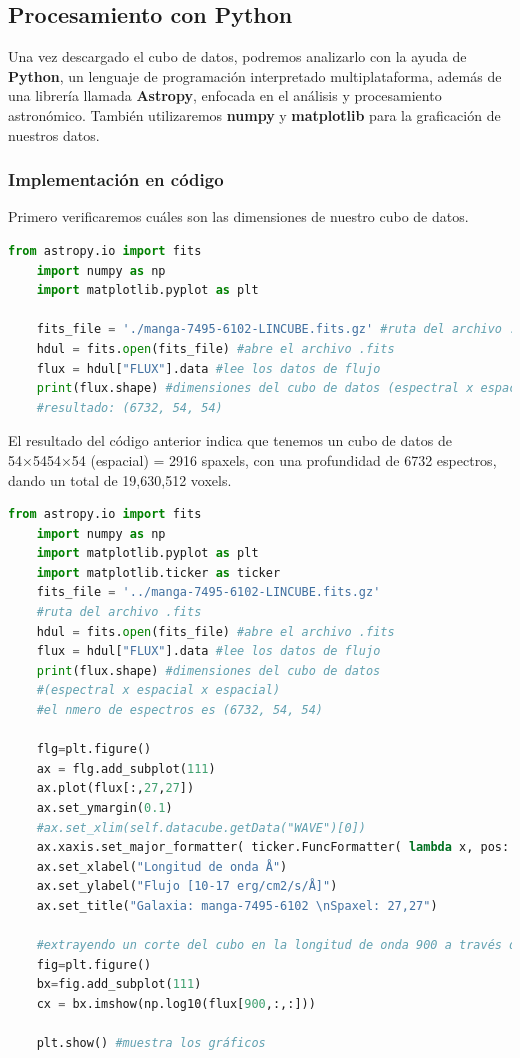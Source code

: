 \documentclass[9pt,twocolumn,a4paper]{opticajnl}
\begin{document}
\subsection*{Procesamiento con Python}

Una vez descargado el cubo de datos, podremos analizarlo con la ayuda de \textbf{Python}, un lenguaje de programación interpretado multiplataforma, además de una librería llamada \textbf{Astropy}, enfocada en el análisis y procesamiento astronómico. También utilizaremos \textbf{numpy} y \textbf{matplotlib} para la graficación de nuestros datos.

\subsubsection*{Implementación en código}

Primero verificaremos cuáles son las dimensiones de nuestro cubo de datos.

\begin{lstlisting}[language=Python]
    from astropy.io import fits
    import numpy as np
    import matplotlib.pyplot as plt
    
    fits_file = './manga-7495-6102-LINCUBE.fits.gz' #ruta del archivo .fits
    hdul = fits.open(fits_file) #abre el archivo .fits
    flux = hdul["FLUX"].data #lee los datos de flujo
    print(flux.shape) #dimensiones del cubo de datos (espectral x espacial x espacial)
    #resultado: (6732, 54, 54)
\end{lstlisting}

El resultado del código anterior indica que tenemos un cubo de datos de 54×5454×54 (espacial) = 2916 spaxels, con una profundidad de 6732 espectros, dando un total de 19,630,512 voxels.
\begin{lstlisting}[language=Python]
    from astropy.io import fits
    import numpy as np
    import matplotlib.pyplot as plt
    import matplotlib.ticker as ticker
    fits_file = '../manga-7495-6102-LINCUBE.fits.gz'
    #ruta del archivo .fits
    hdul = fits.open(fits_file) #abre el archivo .fits
    flux = hdul["FLUX"].data #lee los datos de flujo
    print(flux.shape) #dimensiones del cubo de datos
    #(espectral x espacial x espacial)
    #el nmero de espectros es (6732, 54, 54)
    
    flg=plt.figure()
    ax = flg.add_subplot(111)
    ax.plot(flux[:,27,27])
    ax.set_ymargin(0.1)
    #ax.set_xlim(self.datacube.getData("WAVE")[0])
    ax.xaxis.set_major_formatter( ticker.FuncFormatter( lambda x, pos: '{}{}'.format('', str(int(x)+self.datacube.getData("WAVE")[0]))))
    ax.set_xlabel("Longitud de onda Å")
    ax.set_ylabel("Flujo [10-17 erg/cm2/s/Å]")
    ax.set_title("Galaxia: manga-7495-6102 \nSpaxel: 27,27") 
    
    #extrayendo un corte del cubo en la longitud de onda 900 a través de toda la imagen y aplicando log10 - devuelve una imagen  
    fig=plt.figure()
    bx=fig.add_subplot(111) 
    cx = bx.imshow(np.log10(flux[900,:,:]))
    
    plt.show() #muestra los gráficos
\end{lstlisting}
\end{document}
